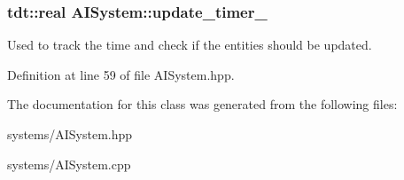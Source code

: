 \subsubsection[{\texorpdfstring{update\+\_\+timer\+\_\+}{update_timer_}}]{\setlength{\rightskip}{0pt plus 5cm}tdt\+::real A\+I\+System\+::update\+\_\+timer\+\_\+\hspace{0.3cm}{\ttfamily [private]}}\hypertarget{class_a_i_system_a9e9d8e37dffa7b02b0e8b322c0f03c9b}{}\label{class_a_i_system_a9e9d8e37dffa7b02b0e8b322c0f03c9b}


Used to track the time and check if the entities should be updated. 



Definition at line 59 of file A\+I\+System.\+hpp.



The documentation for this class was generated from the following files\+:\begin{DoxyCompactItemize}
\item 
systems/A\+I\+System.\+hpp\item 
systems/A\+I\+System.\+cpp\end{DoxyCompactItemize}
